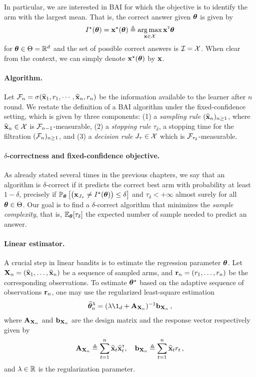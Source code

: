 In particular, we are interested in BAI for which the objective is to identify the arm with the largest mean. That is, the correct answer given ${\boldsymbol \theta}$ is given by 
\[
I^\star({\boldsymbol \theta}) = {\bf x}^\star({\boldsymbol \theta}) \triangleq \operatorname*{arg\,max}_{{\bf x}\in\mathcal{X}} {\bf x}^\mathsf{\scriptscriptstyle T}{\boldsymbol \theta}
\]
for ${\boldsymbol \theta}\in\Theta = \mathbb{R}^d$ and the set of possible correct answers is $\mathcal{I} = \mathcal{X}$. When clear from the context, we can simply denote ${\bf x}^\star({\boldsymbol \theta})$ by ${\bf x}$.

\paragraph{Algorithm.}
Let $\mathcal{F}_{n}=\sigma (\widehat{{\bf x}}_1,r_1,\cdots, \widehat{{\bf x}}_n,r_n)$ be the information available to the learner after $n$ round. We restate the definition of a BAI algorithm under the fixed-confidence setting, which is given by three components: (1) a \emph{sampling rule} $(\widehat{{\bf x}}_n)_{n\geq 1}$, where $\widehat{{\bf x}}_n\in\mathcal{X}$ is $\mathcal{F}_{n-1}$-measurable, (2) a \emph{stopping rule} $\tau_\delta$, a stopping time for the filtration $(\mathcal{F}_n)_{n\geq 1}$, and (3) a \emph{decision rule} $J_\tau\in \mathcal{X}$ which is $\mathcal{F}_{\tau_\delta}$-measurable.

\paragraph{$\delta$-correctness and fixed-confidence objective.}
As already stated several times in the previous chapters, we say that an algorithm is $\delta$-correct if it predicts the correct best arm with probability at least $1-\delta$, precisely if $\mathbb{P}_{\boldsymbol \theta}\left[\big({\bf x}_{J_\tau} \neq I^\star({\boldsymbol \theta})\big) \leq \delta\right]$ and $\tau_\delta < +\infty$ almost surely for all ${\boldsymbol \theta} \in\Theta$. Our goal is to find a $\delta$-correct algorithm that minimizes the \emph{sample complexity}, that is,  $\mathbb{E}_{\boldsymbol \theta}[\tau_\delta]$ the expected number of sample needed to predict an answer.

\paragraph{Linear estimator.}
A crucial step in linear bandits is to estimate the regression parameter ${\boldsymbol \theta}$. Let ${\bf X}_n=(\widehat{{\bf x}}_1,\ldots,\widehat{{\bf x}}_n)$ be a sequence of sampled arms, and ${\bf r}_n=(r_1,\ldots,r_n)$ be the corresponding observations. To estimate ${\boldsymbol \theta}^\star$ based on the adaptive sequence of observations ${\bf r}_n$, one may use the \gls{regularized least-square estimation}
\begin{align}\label{eq:update_mean}
    \hat{\btheta}_n^{\lambda} = (\lambda \1_d + \bA_{\bX_n})^{-1}\bb_{\bX_n}\,,
\end{align}
where ${\bf A}_{{\bf X}_n}$ and ${\bf b}_{{\bf X}_n}$ are the design matrix and the response vector respectively given by
\[
    {\bf A}_{{\bf X}_n} \triangleq \sum_{t=1}^n \widehat{{\bf x}}_t\widehat{{\bf x}}_t^\mathsf{\scriptscriptstyle T}, \quad {\bf b}_{{\bf X}_n} \triangleq \sum_{t=1}^n \widehat{{\bf x}}_t r_t\,,
\]
and $\lambda\in\mathbb{R}$ is the regularization parameter.

